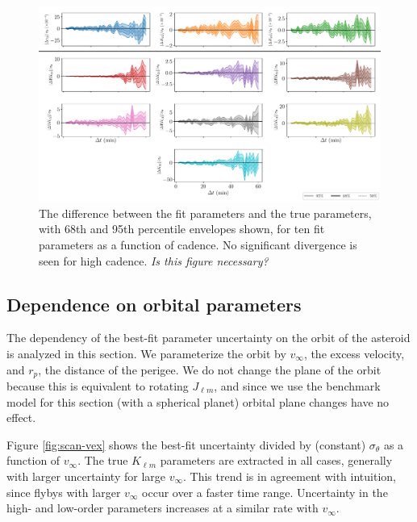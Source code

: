 \documentclass{aastex631}
\newcommand{\jtd}[1]{{\color{red}\textit{#1}}}
\begin{document}
\begin{figure}
  \centering
  \includegraphics[width=\textwidth]{cadence-accuracy.pdf}
  \caption{The difference between the fit parameters and the true parameters, with 68th and 95th percentile envelopes shown, for ten fit parameters as a function of cadence. No significant divergence is seen for high cadence. \jtd{Is this figure necessary?}}
  \label{fig:cadence-accuracy}
\end{figure}

\subsection{Dependence on orbital parameters}

The dependency of the best-fit parameter uncertainty on the orbit of the asteroid is analyzed in this section. We parameterize the orbit by $v_\infty$, the excess velocity, and $r_p$, the distance of the perigee. We do not change the plane of the orbit because this is equivalent to rotating $J_{\ell m}$, and since we use the benchmark model for this section (with a spherical planet) orbital plane changes have no effect.

Figure \ref{fig:scan-vex} shows the best-fit uncertainty divided by (constant) $\sigma_\theta$ as a function of $v_\infty$. The true $K_{\ell m}$ parameters are extracted in all cases, generally with larger uncertainty for large $v_\infty$. This trend is in agreement with intuition, since flybys with larger $v_\infty$ occur over a faster time range. Uncertainty in the high- and low-order parameters increases at a similar rate with $v_\infty$.
\end{document}

